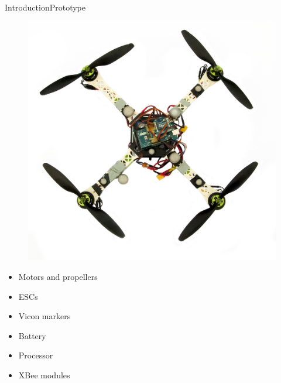 \begin{frame}{Introduction}{Prototype}
    \begin{minipage}{\linewidth}
        \begin{minipage}{0.55\linewidth}
             \begin{figure}[H]
                 \centering
                 \includegraphics[width=\textwidth]{figures/quadcopter}
             \end{figure}
        \end{minipage}
        \hspace{0.03\linewidth}
        \begin{minipage}{0.43\linewidth}
            \begin{itemize}
                \item Motors and propellers
                \item ESCs
                \item Vicon markers
                \item Battery
                \item Processor
                \item XBee modules
            \end{itemize} 
        \end{minipage}
    \end{minipage}   
\end{frame}

